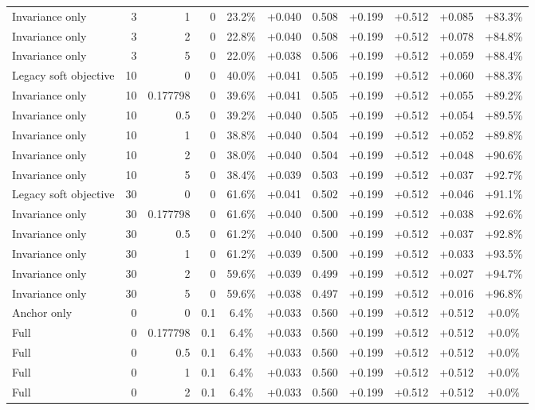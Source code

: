 \begin{table}[htbp]
\begin{tabular}{lrrrccccccc}
Invariance only & 3 & 1 & 0 & 23.2\% & +0.040 & 0.508 & +0.199 & +0.512 & +0.085 & +83.3\% \\
Invariance only & 3 & 2 & 0 & 22.8\% & +0.040 & 0.508 & +0.199 & +0.512 & +0.078 & +84.8\% \\
Invariance only & 3 & 5 & 0 & 22.0\% & +0.038 & 0.506 & +0.199 & +0.512 & +0.059 & +88.4\% \\
Legacy soft objective & 10 & 0 & 0 & 40.0\% & +0.041 & 0.505 & +0.199 & +0.512 & +0.060 & +88.3\% \\
Invariance only & 10 & 0.177798 & 0 & 39.6\% & +0.041 & 0.505 & +0.199 & +0.512 & +0.055 & +89.2\% \\
Invariance only & 10 & 0.5 & 0 & 39.2\% & +0.040 & 0.505 & +0.199 & +0.512 & +0.054 & +89.5\% \\
Invariance only & 10 & 1 & 0 & 38.8\% & +0.040 & 0.504 & +0.199 & +0.512 & +0.052 & +89.8\% \\
Invariance only & 10 & 2 & 0 & 38.0\% & +0.040 & 0.504 & +0.199 & +0.512 & +0.048 & +90.6\% \\
Invariance only & 10 & 5 & 0 & 38.4\% & +0.039 & 0.503 & +0.199 & +0.512 & +0.037 & +92.7\% \\
Legacy soft objective & 30 & 0 & 0 & 61.6\% & +0.041 & 0.502 & +0.199 & +0.512 & +0.046 & +91.1\% \\
Invariance only & 30 & 0.177798 & 0 & 61.6\% & +0.040 & 0.500 & +0.199 & +0.512 & +0.038 & +92.6\% \\
Invariance only & 30 & 0.5 & 0 & 61.2\% & +0.040 & 0.500 & +0.199 & +0.512 & +0.037 & +92.8\% \\
Invariance only & 30 & 1 & 0 & 61.2\% & +0.039 & 0.500 & +0.199 & +0.512 & +0.033 & +93.5\% \\
Invariance only & 30 & 2 & 0 & 59.6\% & +0.039 & 0.499 & +0.199 & +0.512 & +0.027 & +94.7\% \\
Invariance only & 30 & 5 & 0 & 59.6\% & +0.038 & 0.497 & +0.199 & +0.512 & +0.016 & +96.8\% \\
Anchor only & 0 & 0 & 0.1 & 6.4\% & +0.033 & 0.560 & +0.199 & +0.512 & +0.512 & +0.0\% \\
Full & 0 & 0.177798 & 0.1 & 6.4\% & +0.033 & 0.560 & +0.199 & +0.512 & +0.512 & +0.0\% \\
Full & 0 & 0.5 & 0.1 & 6.4\% & +0.033 & 0.560 & +0.199 & +0.512 & +0.512 & +0.0\% \\
Full & 0 & 1 & 0.1 & 6.4\% & +0.033 & 0.560 & +0.199 & +0.512 & +0.512 & +0.0\% \\
Full & 0 & 2 & 0.1 & 6.4\% & +0.033 & 0.560 & +0.199 & +0.512 & +0.512 & +0.0\% \\

\end{tabular}
\end{table}
